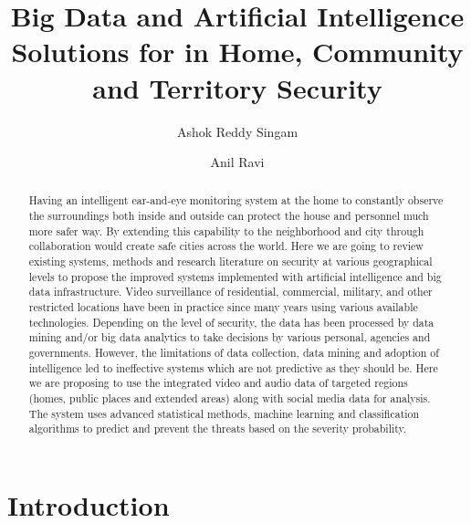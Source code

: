 \documentclass[sigconf]{acmart}
\begin{document}
\title{Big Data and Artificial Intelligence Solutions for in Home, Community and Territory Security}


\author{Ashok Reddy Singam}

\author{Anil Ravi}

\begin{abstract}
Having an intelligent ear-and-eye monitoring system at the home to constantly observe the surroundings both inside and outside can protect the house and personnel much more safer way. By extending this capability to the neighborhood and city through collaboration would create safe cities across the world. Here we are going to review existing systems, methods and research literature on security at various geographical levels to propose the improved systems implemented with artificial intelligence and big data infrastructure. Video surveillance of residential, commercial, military, and other restricted locations have been in practice since many years using various available technologies. Depending on the level of security, the data has been processed by data mining and/or big data analytics to take decisions by various personal, agencies and governments. However, the limitations of data collection, data mining and adoption of intelligence led to ineffective systems which are not predictive as they should be. Here we are proposing to use the integrated video and audio data of targeted regions (homes, public places and extended areas) along with social media data for analysis. The system uses advanced statistical methods, machine learning and classification algorithms to predict and prevent the threats based on the severity probability.

\end{abstract}



\maketitle

\section{Introduction}
\end{document}
